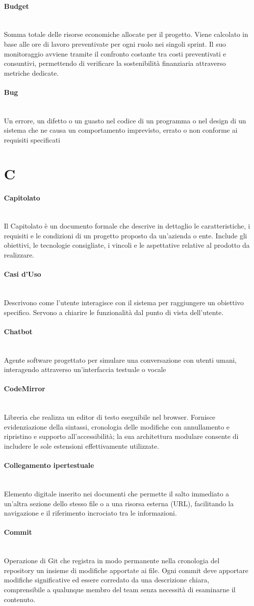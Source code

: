 \documentclass[a4paper, 10pt, colorlinks=true, linkcolor=black, urlcolor=blue, citecolor=blue, hidelinks]{article}
\newcommand{\glossaryterm}[2]{
    \paragraph{#1 \label{term:#1}} \mbox{} \\
    #2
    \vspace{0.5em}
}
\begin{document}
\glossaryterm{Budget}{Somma totale delle risorse economiche allocate per il progetto. Viene calcolato in base alle ore di lavoro preventivate per ogni ruolo nei singoli sprint. Il suo monitoraggio avviene tramite il confronto costante tra costi preventivati e consuntivi, permettendo di verificare la sostenibilità finanziaria attraverso metriche dedicate.}

\glossaryterm{Bug}{Un errore, un difetto o un guasto nel codice di un programma o nel design di un sistema che ne causa un comportamento imprevisto, errato o non conforme ai requisiti specificati}

\newpage

\section*{C}

\glossaryterm{Capitolato}{Il Capitolato è un documento formale che descrive in dettaglio le caratteristiche, i requisiti e le condizioni di un progetto proposto da un'azienda o ente. Include gli obiettivi, le tecnologie consigliate, i vincoli e le aspettative relative al prodotto da realizzare.}

\glossaryterm{Casi d'Uso}{Descrivono come l'utente interagisce con il sistema per raggiungere un obiettivo specifico. Servono a chiarire le funzionalità dal punto di vista dell'utente.}

\glossaryterm{Chatbot}{Agente software progettato per simulare una conversazione con utenti umani, interagendo attraverso un'interfaccia testuale o vocale}

\glossaryterm{CodeMirror}{Libreria che realizza un editor di testo eseguibile nel browser. Fornisce evidenziazione della sintassi, cronologia delle modifiche con annullamento e ripristino e supporto all'accessibilità; la sua architettura modulare consente di includere le sole estensioni effettivamente utilizzate.}

\glossaryterm{Collegamento ipertestuale}{Elemento digitale inserito nei documenti che permette il salto immediato a un'altra sezione dello stesso file o a una risorsa esterna (URL), facilitando la navigazione e il riferimento incrociato tra le informazioni.}

\glossaryterm{Commit}{Operazione di Git che registra in modo permanente nella cronologia del repository un insieme di modifiche apportate ai file. Ogni commit deve apportare modifiche significative ed essere corredato da una descrizione chiara, comprensibile a qualunque membro del team senza necessità di esaminarne il contenuto.}
\end{document}
